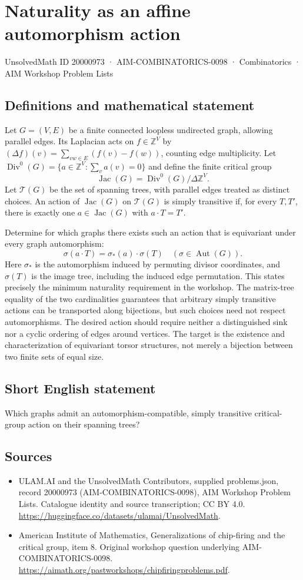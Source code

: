 \documentclass[11pt,a4paper]{article}
\begin{document}
\section*{Naturality as an affine automorphism action}\label{20000973}
{\small UnsolvedMath ID 20000973 · AIM-COMBINATORICS-0098 · Combinatorics · AIM Workshop Problem Lists}
\subsection{Definitions and mathematical statement}
Let $G=(V,E)$ be a finite connected loopless undirected graph, allowing parallel edges.
Its Laplacian acts on $f\in\mathbb Z^V$ by
$(\Delta f)(v)=\sum_{vw\in E}(f(v)-f(w))$, counting edge multiplicity.
Let $\operatorname{Div}^0(G)=\{a\in\mathbb Z^V:\sum_v a(v)=0\}$ and define the finite critical group
\[
 \operatorname{Jac}(G)=\operatorname{Div}^0(G)/\Delta\mathbb Z^V.
\]
Let $\mathcal T(G)$ be the set of spanning trees, with parallel edges treated as distinct choices.
An action of $\operatorname{Jac}(G)$ on $\mathcal T(G)$ is simply transitive if, for every $T,T'$, there is exactly one $a\in\operatorname{Jac}(G)$ with $a\cdot T=T'$.

Determine for which graphs there exists such an action that is equivariant under every graph automorphism:
\[
 \sigma(a\cdot T)=\sigma_*(a)\cdot\sigma(T)
 \quad(\sigma\in\operatorname{Aut}(G)).
\]
Here $\sigma_*$ is the automorphism induced by permuting divisor coordinates, and $\sigma(T)$ is the image tree, including the induced edge permutation.
This states precisely the minimum naturality requirement in the workshop.
The matrix-tree equality of the two cardinalities guarantees that arbitrary simply transitive actions can be transported along bijections, but such choices need not respect automorphisms.
The desired action should require neither a distinguished sink nor a cyclic ordering of edges around vertices.
The target is the existence and characterization of equivariant torsor structures, not merely a bijection between two finite sets of equal size.
\subsection{Short English statement}
Which graphs admit an automorphism-compatible, simply transitive critical-group action on their spanning trees?
\subsection{Sources}
\begin{itemize}
\item[S1] ULAM.AI and the UnsolvedMath Contributors, supplied problems.json, record 20000973 (AIM-COMBINATORICS-0098), AIM Workshop Problem Lists. Catalogue identity and source transcription; CC BY 4.0.
\url{https://huggingface.co/datasets/ulamai/UnsolvedMath}.
\item[S2] American Institute of Mathematics, Generalizations of chip-firing and the critical group, item 8. Original workshop question underlying AIM-COMBINATORICS-0098.
\url{https://aimath.org/pastworkshops/chipfiringproblems.pdf}.
\end{itemize}
\end{document}
